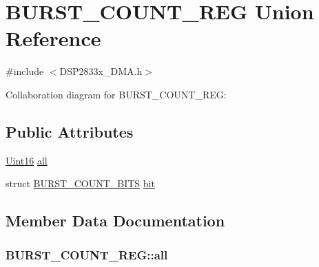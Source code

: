 \hypertarget{union_b_u_r_s_t___c_o_u_n_t___r_e_g}{}\section{B\+U\+R\+S\+T\+\_\+\+C\+O\+U\+N\+T\+\_\+\+R\+E\+G Union Reference}
\label{union_b_u_r_s_t___c_o_u_n_t___r_e_g}


{\ttfamily \#include $<$D\+S\+P2833x\+\_\+\+D\+M\+A.\+h$>$}



Collaboration diagram for B\+U\+R\+S\+T\+\_\+\+C\+O\+U\+N\+T\+\_\+\+R\+E\+G\+:
\subsection*{Public Attributes}
\begin{DoxyCompactItemize}
\item 
\hyperlink{_d_s_p2833x___device_8h_a59a9f6be4562c327cbfb4f7e8e18f08b}{Uint16} \hyperlink{union_b_u_r_s_t___c_o_u_n_t___r_e_g_a0c306ba964b87451a151b3d39b1c41b2}{all}
\item 
struct \hyperlink{struct_b_u_r_s_t___c_o_u_n_t___b_i_t_s}{B\+U\+R\+S\+T\+\_\+\+C\+O\+U\+N\+T\+\_\+\+B\+I\+T\+S} \hyperlink{union_b_u_r_s_t___c_o_u_n_t___r_e_g_abe74397af393c9ec02109b04a8039daa}{bit}
\end{DoxyCompactItemize}


\subsection{Member Data Documentation}
\hypertarget{union_b_u_r_s_t___c_o_u_n_t___r_e_g_a0c306ba964b87451a151b3d39b1c41b2}{}
\subsubsection[{all}]{ B\+U\+R\+S\+T\+\_\+\+C\+O\+U\+N\+T\+\_\+\+R\+E\+G\+::all}\label{union_b_u_r_s_t___c_o_u_n_t___r_e_g_a0c306ba964b87451a151b3d39b1c41b2}
\hypertarget{union_b_u_r_s_t___c_o_u_n_t___r_e_g_abe74397af393c9ec02109b04a8039daa}{}
